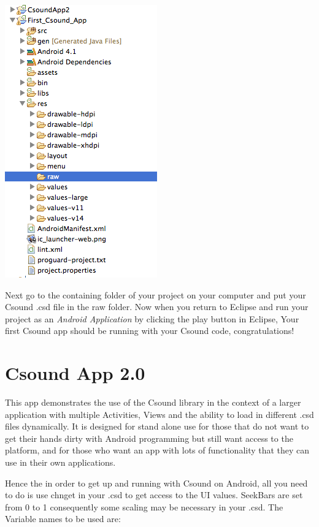 \documentclass[11pt]{article}
\begin{document}
\begin{center}
\includegraphics[scale=0.60]{images/PackageExplorer}
\end{center}

Next go to the containing folder of your project on your computer and put your Csound .csd file in the raw folder. Now when you return to Eclipse and run your project as an \textit{Android Application} by clicking the play button in Eclipse, Your first Csound app should be running with your Csound code, congratulations!


\section{Csound App 2.0}
This app demonstrates the use of the Csound library in the context of a larger application with multiple Activities, Views and the ability to load in different .csd files dynamically. It is designed for stand alone use for those that do not want to get their hands dirty with Android programming but still want access to the platform, and for those who want an app with lots of functionality that they can use in their own applications. 

Hence the in order to get up and running with Csound on Android, all you need to do is use chnget in your .csd to get access to the UI values. SeekBars are set from 0 to 1 consequently some scaling may be necessary in your .csd. The Variable names to be used are:
\end{document}
